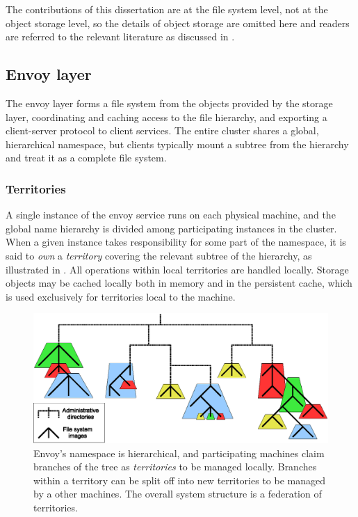 The contributions of this dissertation are at the file system level, not at the object storage level, so the details of object storage are omitted here and readers are referred to the relevant literature as discussed in .

\subsection{Envoy layer}

The envoy layer forms a file system from the objects provided by the storage layer, coordinating and caching access to the file hierarchy, and exporting a client-server protocol to client services. The entire cluster shares a global, hierarchical namespace, but clients typically mount a subtree from the hierarchy and treat it as a complete file system.

\subsubsection{Territories}

A single instance of the envoy service runs on each physical machine, and the global name hierarchy is divided among participating instances in the cluster. When a given instance takes responsibility for some part of the namespace, it is said to \emph{own} a \emph{territory} covering the relevant subtree of the hierarchy, as illustrated in . All operations within local territories are handled locally. Storage objects may be cached locally both in memory and in the persistent cache, which is used exclusively for territories local to the machine.

\begin{figure}[t]
\centering
\includegraphics[width=\figwidth]{figures/territory-structure}
\caption[Territories partitioning the namespace tree]{Envoy's namespace is hierarchical, and participating machines claim branches of the tree as \emph{territories} to be managed locally. Branches within a territory can be split off into new territories to be managed by a other machines. The overall system structure is a federation of territories.}
\label{fig:territory-structure}
\end{figure}

